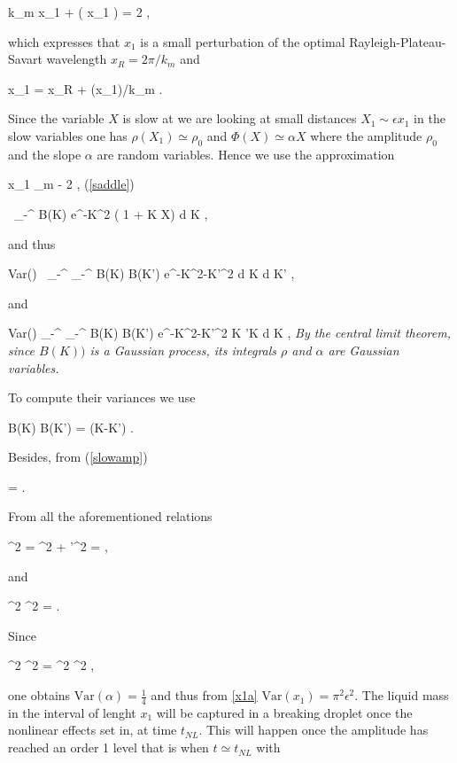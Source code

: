 \be
k_m x_1 + \Phi ( \epsilon x_1 ) = 2 \pi , 
\nd

which expresses that $x_1$ is a small perturbation of the optimal Rayleigh-Plateau-Savart wavelength
$x_{R} = 2 \pi / k_m$ and

\be
x_1 = x_R + \Phi(\epsilon x_1)/k_m . 
\nd

Since the variable $X$ is slow at we are looking at small 
distances $X_1 \sim \epsilon x_1$ in the slow variables
one has $\rho(X_1) \simeq \rho_0$ and  $\Phi(X) \simeq \alpha X$ where 
the amplitude $\rho_0$ and the slope $\alpha$ are random
variables. Hence we use the approximation  

\be
x_1 \simeq \lambda_m -  2 \pi \alpha \epsilon  \label{x1a} , 
\nd
(\ref{saddle})

\be
\rho [ 1 + \ii \alpha X] \simeq \int_{-\infty}^{\infty}  B(K) e^{-K^2} ( 1 + \ii K X)  {\textrm{d}} K ,
\nd

and thus

\be
\textrm{Var}(\rho)  \simeq \int_{-\infty}^{\infty} \int_{-\infty}^{\infty}  B(K) B(K') e^{-K^2-K'^2}  {\textrm{d}} K  {\textrm{d}} K'  , 
\nd

and

\be
\textrm{Var}(\rho \alpha) \simeq  \int_{-\infty}^{\infty} \int_{-\infty}^{\infty}  B(K) B(K') e^{-K^2-K'^2}  K 'K {\textrm{d}} K , 
\nd
{\em By the central limit theorem, since $B(K))$ is a Gaussian process, its integrals $\rho$ and $\alpha$ are Gaussian variables.}

To compute their variances we use

\be
\langle B(K) \overline B(K') \rangle =  \delta(K-K') .
\nd

Besides, from (\ref{slowamp}) 

\be
\langle \rho \rangle =  . 
\nd

From all the aforementioned relations  

\be
\langle \rho^2 \rangle = \langle \rho \rangle^2 + \langle \rho'^2 \rangle =   , 
\nd

and

\be
\langle \rho^2 \alpha^2 \rangle =   . 
\nd

Since

\be
\langle \rho^2 \alpha^2 \rangle =  \langle \rho^2 \rangle \langle \alpha^2 \rangle , 
\nd

one obtains $\textrm{Var}( \alpha ) = \frac 14$
and thus from \eqref{x1a}  $\textrm{Var}(x_1) =\pi^2 \epsilon^2$.
The liquid mass in the interval of lenght $x_1$ will be captured in a breaking droplet
once the nonlinear effects set in, at time $t_{NL}$. This will happen once the
amplitude has reached an order 1 level that is when $t \simeq t_{NL}$ with

